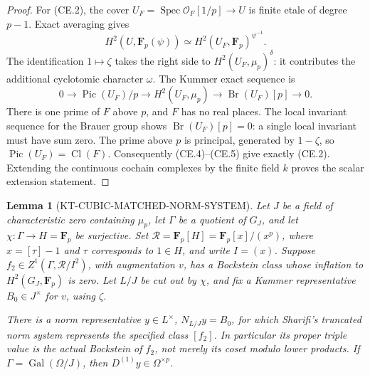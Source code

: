 \documentclass[11pt,a4paper]{article}
\newtheorem{lemma}[theorem]{Lemma}
\theoremstyle{definition}
\begin{document}
\begin{proof}
For (CE.2), the cover
\(U_F=\operatorname{Spec}\mathcal O_F[1/p]\to U\) is finite
etale of degree \(p-1\).  Exact averaging gives
\[
 H^2(U,\mathbf F_p(\psi))
     \simeq H^2(U_F,\mathbf F_p)^{\psi^{-1}}.
                                                        \tag{CE.4}
\]
The identification \(1\mapsto\zeta\) takes the right side to
\(H^2(U_F,\mu_p)^\delta\): it contributes the additional
cyclotomic character \(\omega\).  The Kummer exact sequence is
\[
 0\longrightarrow \operatorname{Pic}(U_F)/p
 \longrightarrow H^2(U_F,\mu_p)
 \longrightarrow \operatorname{Br}(U_F)[p]\longrightarrow0.
                                                        \tag{CE.5}
\]
There is one prime of \(F\) above \(p\), and \(F\) has no real
places.  The local invariant sequence for the Brauer group shows
\(\operatorname{Br}(U_F)[p]=0\): a single local invariant must
have sum zero.  The prime above \(p\) is principal, generated
by \(1-\zeta\), so \(\operatorname{Pic}(U_F)=\operatorname{Cl}(F)\).
Consequently (CE.4)--(CE.5) give exactly (CE.2).  Extending the
continuous cochain complexes by the finite field \(k\) proves
the scalar extension statement.
\end{proof}

\begin{lemma}[KT-CUBIC-MATCHED-NORM-SYSTEM]
Let \(J\) be a field of characteristic zero containing \(\mu_p\),
let \(\Gamma\) be a quotient of \(G_J\), and let
\(\chi:\Gamma\to H=\mathbf F_p\) be surjective.
Set \(\mathcal R=\mathbf F_p[H]=\mathbf F_p[x]/(x^p)\),
where \(x=[\tau]-1\) and \(\tau\) corresponds to \(1\in H\),
and write \(I=(x)\).
Suppose \(f_2\in Z^1(\Gamma,\mathcal R/I^2)\), with augmentation
\(v\), has a Bockstein class whose inflation to
\(H^2(G_J,\mathbf F_p)\) is zero.  Let \(L/J\) be cut out
by \(\chi\), and fix a Kummer representative \(B_0\in J^\times\)
for \(v\), using \(\zeta\).

There is a norm representative \(y\in L^\times\),
\(N_{L/J}y=B_0\), for which Sharifi's truncated norm system
represents the specified class \([f_2]\).  In particular its
proper triple value is the actual Bockstein of \(f_2\),
not merely its coset modulo lower products.  If
\(\Gamma=\operatorname{Gal}(\Omega/J)\), then
\(D^{(1)}y\in\Omega^{\times p}\).
\end{lemma}
\end{document}
